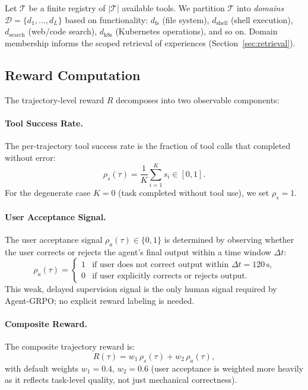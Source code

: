 Let $\mathcal{T}$ be a finite registry of $|\mathcal{T}|$ available tools.
We partition $\mathcal{T}$ into \emph{domains} $\mathcal{D} =
\{d_1, \ldots, d_L\}$ based on functionality: $d_{\text{fs}}$ (file system),
$d_{\text{shell}}$ (shell execution), $d_{\text{search}}$ (web/code search),
$d_{\text{k8s}}$ (Kubernetes operations), and so on. Domain membership informs
the scoped retrieval of experiences (Section~\ref{sec:retrieval}).

\subsection{Reward Computation}
\label{sec:reward}

The trajectory-level reward $R$ decomposes into two observable components:

\paragraph{Tool Success Rate.}
The per-trajectory tool success rate is the fraction of tool calls that
completed without error:
\begin{equation}
    \rho_s(\tau) = \frac{1}{K} \sum_{i=1}^K s_i \in [0, 1].
    \label{eq:tool-success}
\end{equation}
For the degenerate case $K = 0$ (task completed without tool use), we set
$\rho_s = 1$.

\paragraph{User Acceptance Signal.}
The user acceptance signal $\rho_a(\tau) \in \{0, 1\}$ is determined by
observing whether the user corrects or rejects the agent's final output within
a time window $\Delta t$:
\begin{equation}
    \rho_a(\tau) =
    \begin{cases}
        1 & \text{if user does not correct output within } \Delta t = 120\,\text{s,} \\
        0 & \text{if user explicitly corrects or rejects output.}
    \end{cases}
    \label{eq:user-accept}
\end{equation}
This weak, delayed supervision signal is the only human signal required by
Agent-GRPO; no explicit reward labeling is needed.

\paragraph{Composite Reward.}
The composite trajectory reward is:
\begin{equation}
    R(\tau) = w_1\,\rho_s(\tau) + w_2\,\rho_a(\tau),
    \label{eq:composite-reward}
\end{equation}
with default weights $w_1 = 0.4$, $w_2 = 0.6$ (user acceptance is weighted
more heavily as it reflects task-level quality, not just mechanical correctness).

